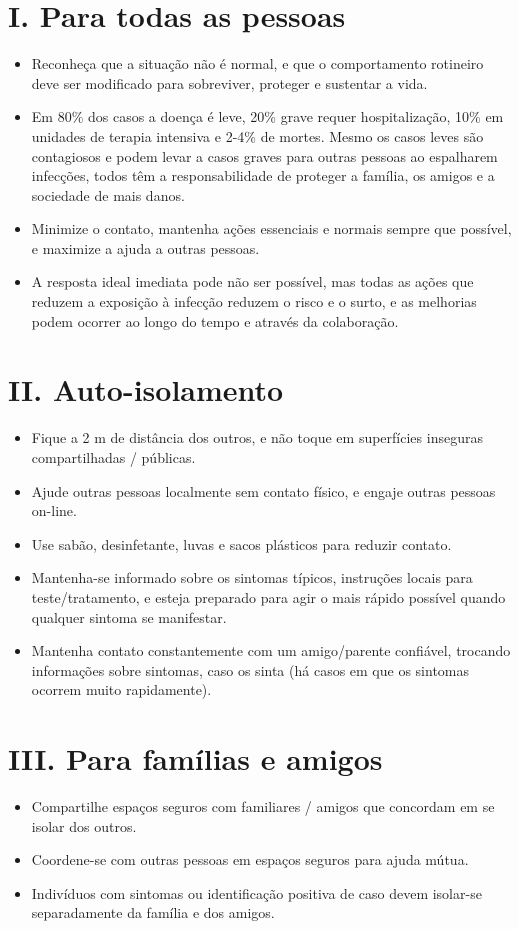 \documentclass[onecolumn,journal]{IEEEtran}
\begin{document}
\begin{multicols}{2}


\section*{I. Para todas as pessoas}
\begin{itemize}
\item Reconheça que a situação não é normal, e que o comportamento rotineiro deve ser modificado para sobreviver, proteger e sustentar a vida.
\item Em 80\% dos casos a doença é leve, 20\% grave requer hospitalização, 10\% em unidades de terapia intensiva e 2-4\% de mortes. Mesmo os casos leves são contagiosos e podem levar a casos graves para outras pessoas ao espalharem infecções, todos têm a responsabilidade de proteger a família, os amigos e a sociedade de mais danos.
\item Minimize o contato, mantenha ações essenciais e normais sempre que possível, e maximize a ajuda a outras pessoas.
\item A resposta ideal imediata pode não ser possível, mas todas as ações que reduzem a exposição à infecção reduzem o risco e o surto, e as melhorias podem ocorrer ao longo do tempo e através da colaboração.
\end{itemize}


\section*{II. Auto-isolamento}
\begin{itemize}
\item Fique a 2 m de distância dos outros, e não toque em superfícies inseguras compartilhadas / públicas.
\item Ajude outras pessoas localmente sem contato físico, e engaje outras pessoas on-line.
\item Use sabão, desinfetante, luvas e sacos plásticos para reduzir contato.
\item Mantenha-se informado sobre os sintomas típicos, instruções locais para teste/tratamento, e esteja preparado para agir o mais rápido possível quando qualquer sintoma se manifestar.
\item Mantenha contato constantemente com um amigo/parente confiável, trocando informações sobre sintomas, caso os sinta (há casos em que os sintomas ocorrem muito rapidamente).
\end{itemize}

\section*{III. Para famílias e amigos}
\begin{itemize}
\item Compartilhe espaços seguros com familiares / amigos que concordam em se isolar dos outros.
\item Coordene-se com outras pessoas em espaços seguros para ajuda mútua.
\item Indivíduos com sintomas ou identificação positiva de caso devem isolar-se separadamente da família e dos amigos.
\end{itemize}


\end{multicols}
\end{document}
